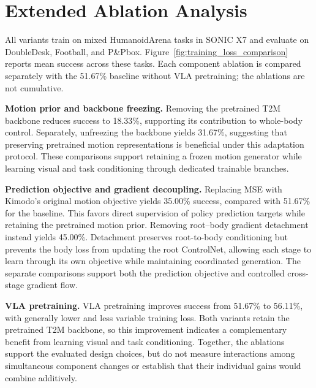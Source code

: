 \section{Extended Ablation Analysis}
\label{sec:ablation_analysis_appendix}

All variants train on mixed HumanoidArena tasks in SONIC X7 and evaluate on DoubleDesk, Football, and P\&Pbox. Figure~\ref{fig:training_loss_comparison} reports mean success across these tasks. Each component ablation is compared separately with the 51.67\% baseline without VLA pretraining; the ablations are not cumulative.

\textbf{Motion prior and backbone freezing.}
Removing the pretrained T2M backbone reduces success to 18.33\%, supporting its contribution to whole-body control. Separately, unfreezing the backbone yields 31.67\%, suggesting that preserving pretrained motion representations is beneficial under this adaptation protocol. These comparisons support retaining a frozen motion generator while learning visual and task conditioning through dedicated trainable branches.

\textbf{Prediction objective and gradient decoupling.}
Replacing MSE with Kimodo's original motion objective yields 35.00\% success, compared with 51.67\% for the baseline. This favors direct supervision of policy prediction targets while retaining the pretrained motion prior. Removing root--body gradient detachment instead yields 45.00\%. Detachment preserves root-to-body conditioning but prevents the body loss from updating the root ControlNet, allowing each stage to learn through its own objective while maintaining coordinated generation. The separate comparisons support both the prediction objective and controlled cross-stage gradient flow.

\textbf{VLA pretraining.}
VLA pretraining improves success from 51.67\% to 56.11\%, with generally lower and less variable training loss. Both variants retain the pretrained T2M backbone, so this improvement indicates a complementary benefit from learning visual and task conditioning. Together, the ablations support the evaluated design choices, but do not measure interactions among simultaneous component changes or establish that their individual gains would combine additively.
